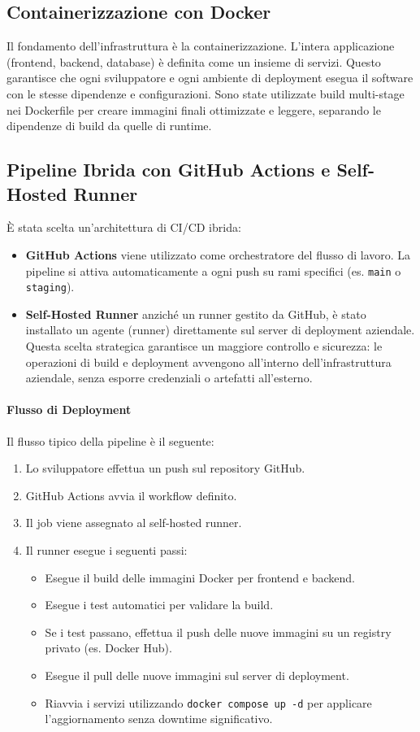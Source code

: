 \documentclass[12pt,a4paper,openright,twoside]{book}
\begin{document}
\subsection{Containerizzazione con Docker}
Il fondamento dell'infrastruttura è la containerizzazione. L'intera applicazione (frontend, backend, database) è definita come un insieme di servizi. Questo garantisce che ogni sviluppatore e ogni ambiente di deployment esegua il software con le stesse dipendenze e configurazioni. Sono state utilizzate build multi-stage nei Dockerfile per creare immagini finali ottimizzate e leggere, separando le dipendenze di build da quelle di runtime.

\subsection{Pipeline Ibrida con GitHub Actions e Self-Hosted Runner}
È stata scelta un'architettura di CI/CD ibrida:
\begin{itemize}
    \item \textbf{GitHub Actions} viene utilizzato come orchestratore del flusso di lavoro. La pipeline si attiva automaticamente a ogni push su rami specifici (es. \texttt{main} o \texttt{staging}).
    \item \textbf{Self-Hosted Runner} anziché un runner gestito da GitHub, è stato installato un agente (runner) direttamente sul server di deployment aziendale. Questa scelta strategica garantisce un maggiore controllo e sicurezza: le operazioni di build e deployment avvengono all'interno dell'infrastruttura aziendale, senza esporre credenziali o artefatti all'esterno.
\end{itemize}

\paragraph{Flusso di Deployment} Il flusso tipico della pipeline è il seguente:
\begin{enumerate}
    \item Lo sviluppatore effettua un push sul repository GitHub.
    \item GitHub Actions avvia il workflow definito.
    \item Il job viene assegnato al self-hosted runner.
    \item Il runner esegue i seguenti passi:
          \begin{itemize}
              \item Esegue il build delle immagini Docker per frontend e backend.
              \item Esegue i test automatici per validare la build.
              \item Se i test passano, effettua il push delle nuove immagini su un registry privato (es. Docker Hub).
              \item Esegue il pull delle nuove immagini sul server di deployment.
              \item Riavvia i servizi utilizzando \texttt{docker compose up -d} per applicare l'aggiornamento senza downtime significativo.
          \end{itemize}
\end{enumerate}
\end{document}
